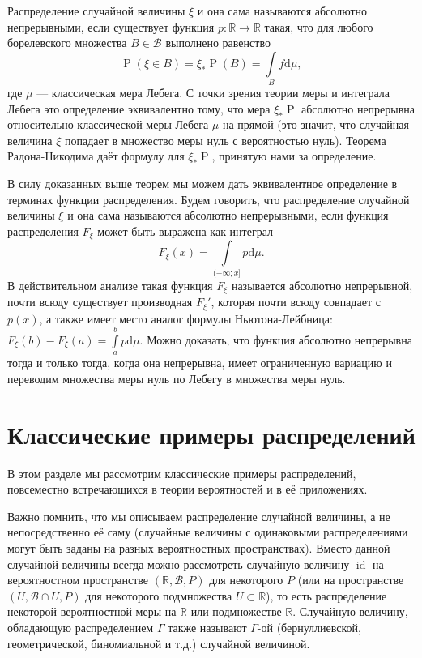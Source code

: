\documentclass[12pt]{article}
\numberwithin{theorem}{section}
\theoremstyle{definition}
\newcommand{\RR}{\mathbb{R}}
\newcommand{\calB}{\mathcal{B}}
\newcommand{\id}{\operatorname{id}}
\newcommand{\prob}{\operatorname{P}}
\newcommand{\defin}[2]{\hypertarget{#2}{{\color{red} #1}}}
\newcommand{\diff}{\mathrm{d}}
\begin{document}
	Распределение случайной величины $ \xi $ и она сама называются \defin{абсолютно непрерывными}{absolutely-continuous},
	если существует функция $ p \colon \mathbb{R} \to \mathbb{R} $ такая, что
	для любого борелевского множества $ B \in \calB $ выполнено равенство
	$$ \prob(\xi \in B) = \xi_*\prob(B) = \int\limits_{B} f\diff\mu, $$
	где $ \mu $ --- классическая мера Лебега.
	С точки зрения теории меры и интеграла Лебега это определение эквивалентно тому,
	что мера $ \xi_*\prob $ абсолютно непрерывна относительно классической меры Лебега $ \mu $ на прямой
	(это значит, что случайная величина $ \xi $ попадает в множество меры нуль с вероятностью нуль).
	Теорема Радона-Никодима даёт формулу для $ \xi_*\prob $, принятую нами за определение.
	
	
	В силу доказанных выше теорем мы можем дать эквивалентное определение в терминах функции распределения.
	Будем говорить, что распределение случайной величины $ \xi $ и она сама называются \defin{абсолютно непрерывными}{absolutely-continuous-2}, если функция распределения $ F_\xi $ может быть выражена как интеграл
	$$ F_\xi(x) = \int\limits_{(-\infty; x]} p\diff\mu. $$
	В действительном анализе такая функция $ F_\xi $ называется абсолютно непрерывной,
	почти всюду существует производная $ F_\xi' $, которая почти всюду совпадает с $ p(x) $,
	а также имеет место аналог формулы Ньютона-Лейбница: $ F_\xi(b) - F_\xi(a) = \int\limits_{a}^{b} p\diff\mu $.
	Можно доказать, что функция абсолютно непрерывна тогда и только тогда,
	когда она непрерывна, имеет ограниченную вариацию и переводим множества меры нуль по Лебегу в множества меры нуль.
	
	\section{Классические примеры распределений} 
	
	В этом разделе мы рассмотрим классические примеры распределений,
	повсеместно встречающихся в теории вероятностей и в её приложениях.
	
	Важно помнить, что мы описываем распределение случайной величины, а не непосредственно её саму 
	(случайные величины с одинаковыми распределениями могут быть заданы на разных вероятностных пространствах).
	Вместо данной случайной величины всегда можно рассмотреть случайную величину $ \id $ на вероятностном пространстве
	$ (\RR, \calB, P) $ для некоторого $ P $ 
	(или на пространстве $ (U, \calB \cap U, P) $ для некоторого подмножества $ U \subset \RR $),
	то есть распределение некоторой вероятностной меры на $ \RR $ или подмножестве $ \RR $.
	Случайную величину, обладающую распределением $ \Gamma $ также называют $ \Gamma $-ой (бернуллиевской, геометрической, биномиальной и т.д.) случайной величиной.
	
\end{document}
